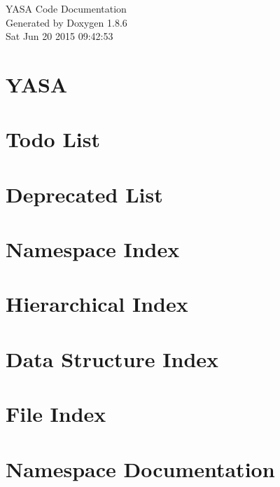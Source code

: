 \documentclass[twoside]{book}
\newcommand{\clearemptydoublepage}{%
  \newpage{\pagestyle{empty}\cleardoublepage}%
}
\begin{document}
\hypersetup{pageanchor=false}
\begin{titlepage}
\vspace*{7cm}
\begin{center}%
{\Large Y\-A\-S\-A Code Documentation }\\
\vspace*{1cm}
{\large Generated by Doxygen 1.8.6}\\
\vspace*{0.5cm}
{\small Sat Jun 20 2015 09:42:53}\\
\end{center}
\end{titlepage}
\clearemptydoublepage
\tableofcontents
\clearemptydoublepage
{}
\hypersetup{pageanchor=true}

\chapter{Y\-A\-S\-A}
\label{md__r_e_a_d_m_e}
\hypertarget{md__r_e_a_d_m_e}{}

\chapter{Todo List}
\label{todo}
\hypertarget{todo}{}

\chapter{Deprecated List}
\label{deprecated}
\hypertarget{deprecated}{}

\chapter{Namespace Index}

\chapter{Hierarchical Index}

\chapter{Data Structure Index}

\chapter{File Index}

\chapter{Namespace Documentation}







\end{document}
